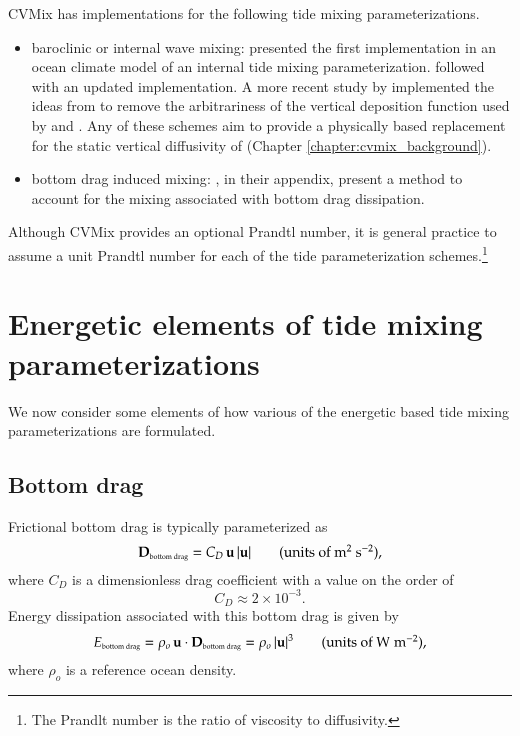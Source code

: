 CVMix has implementations for the following tide mixing
parameterizations.
\begin{itemize}
 
\item {\sc baroclinic or internal wave mixing}: \cite{Simmonsetal2004}
  presented the first implementation in an ocean climate model of an
  internal tide mixing parameterization.  \cite{Jayne2009} followed
  with an updated implementation.  A more recent study by
  \cite{Melet_etal_2013} implemented the ideas from \cite{Polzin2009}
  to remove the arbitrariness of the vertical deposition function used
  by \cite{Simmonsetal2004} and \cite{Jayne2009}.  Any of these
  schemes aim to provide a physically based replacement for the static
  vertical diffusivity of \cite{BryanLewis1979} (Chapter
  \ref{chapter:cvmix_background}).

\item {\sc bottom drag induced mixing}: \cite{Legg_eta2006}, in their
  appendix, present a method to account for the mixing associated with
  bottom drag dissipation.

\end{itemize}
Although CVMix provides an optional Prandtl number, it is general
practice to assume a unit Prandtl number for each of the tide
parameterization schemes.\footnote{The Prandlt number is the ratio of
  viscosity to diffusivity.}



\section{Energetic elements of tide mixing parameterizations}
\label{section:vert_tidal_formulation}

We now consider some elements of how various of the energetic based
tide mixing parameterizations are formulated. 


\subsection{Bottom drag}
\label{subsection:bottom-drag-barotropic-tides}

Frictional bottom drag is typically parameterized as
\begin{equation}
  {\bf D}_{\mbox{\tiny bottom drag}} = C_{D} \, {\bf u} \, | {\bf u}|
  \qquad \mbox{(units of $\mbox{m}^{2}~\mbox{s}^{-2}$),}
\end{equation}
where $C_{D}$ is a dimensionless drag coefficient with a value on the
order of
\begin{equation}
C_{D} \approx  2 \times 10^{-3}. 
\end{equation}
Energy dissipation associated with this bottom drag is given by
\begin{equation}
 E_{\mbox{\tiny bottom drag}} =
  \rho_{o} \, {\bf u} \cdot {\bf D}_{\mbox{\tiny bottom drag}} 
 = \rho_{o} \, |{\bf u}|^{3}
\qquad \mbox{(units of $\mbox{W} \; \mbox{m}^{-2}$),}
\label{eq:energy-dissipation-bottom-drag-general}
\end{equation}
where $\rho_{o}$ is a reference ocean density.  

